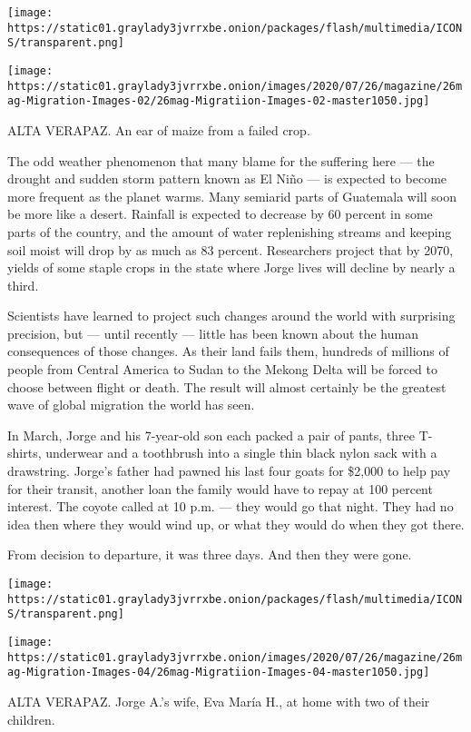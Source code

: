 \texttt{[image: https://static01.graylady3jvrrxbe.onion/packages/flash/multimedia/ICONS/transparent.png]}

\texttt{[image: https://static01.graylady3jvrrxbe.onion/images/2020/07/26/magazine/26mag-Migration-Images-02/26mag-Migratiion-Images-02-master1050.jpg]}

ALTA VERAPAZ. An ear of maize from a failed crop.

The odd weather phenomenon that many blame for the suffering here ---
the drought and sudden storm pattern known as El Niño --- is expected to
become more frequent as the planet warms. Many semiarid parts of
Guatemala will soon be more like a desert. Rainfall is expected to
decrease by 60 percent in some parts of the country, and the amount of
water replenishing streams and keeping soil moist will drop by as much
as 83 percent. Researchers project that by 2070, yields of some staple
crops in the state where Jorge lives will decline by nearly a third.

Scientists have learned to project such changes around the world with
surprising precision, but --- until recently --- little has been known
about the human consequences of those changes. As their land fails them,
hundreds of millions of people from Central America to Sudan to the
Mekong Delta will be forced to choose between flight or death. The
result will almost certainly be the greatest wave of global migration
the world has seen.

In March, Jorge and his 7-year-old son each packed a pair of pants,
three T-shirts, underwear and a toothbrush into a single thin black
nylon sack with a drawstring. Jorge's father had pawned his last four
goats for \$2,000 to help pay for their transit, another loan the family
would have to repay at 100 percent interest. The coyote called at 10
p.m. --- they would go that night. They had no idea then where they
would wind up, or what they would do when they got there.

From decision to departure, it was three days. And then they were gone.

\texttt{[image: https://static01.graylady3jvrrxbe.onion/packages/flash/multimedia/ICONS/transparent.png]}

\texttt{[image: https://static01.graylady3jvrrxbe.onion/images/2020/07/26/magazine/26mag-Migration-Images-04/26mag-Migratiion-Images-04-master1050.jpg]}

ALTA VERAPAZ. Jorge A.'s wife, Eva María H., at home with two of their
children.

